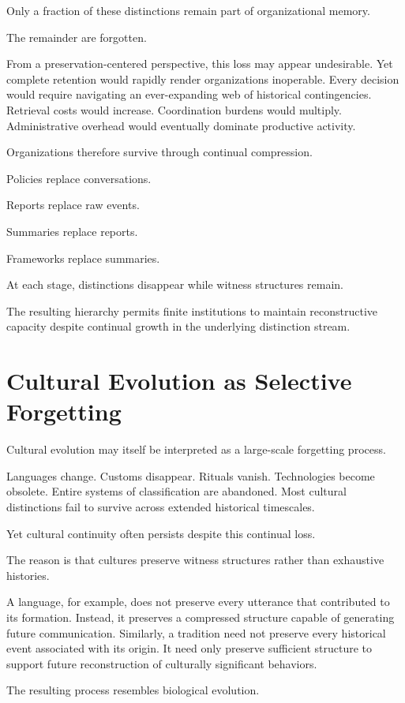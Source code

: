 \documentclass[12pt,oneside]{book}
\theoremstyle{plain} \newtheorem{theorem}{Theorem}[chapter] \newtheorem{lemma}[theorem]{Lemma} \newtheorem{proposition}[theorem]{Proposition} \newtheorem{corollary}[theorem]{Corollary}
\theoremstyle{definition} \newtheorem{definition}[theorem]{Definition} \newtheorem{axiom}[theorem]{Axiom} \newtheorem{construction}[theorem]{Construction}
\theoremstyle{remark} \newtheorem{remark}[theorem]{Remark} \newtheorem{example}[theorem]{Example}
\begin{document}
Only a fraction of these distinctions remain part of organizational memory.

The remainder are forgotten.

From a preservation-centered perspective, this loss may appear undesirable. Yet complete retention would rapidly render organizations inoperable. Every decision would require navigating an ever-expanding web of historical contingencies. Retrieval costs would increase. Coordination burdens would multiply. Administrative overhead would eventually dominate productive activity.

Organizations therefore survive through continual compression.

Policies replace conversations.

Reports replace raw events.

Summaries replace reports.

Frameworks replace summaries.

At each stage, distinctions disappear while witness structures remain.

The resulting hierarchy permits finite institutions to maintain reconstructive capacity despite continual growth in the underlying distinction stream.

\section{Cultural Evolution as Selective Forgetting}

Cultural evolution may itself be interpreted as a large-scale forgetting process.

Languages change. Customs disappear. Rituals vanish. Technologies become obsolete. Entire systems of classification are abandoned. Most cultural distinctions fail to survive across extended historical timescales.

Yet cultural continuity often persists despite this continual loss.

The reason is that cultures preserve witness structures rather than exhaustive histories.

A language, for example, does not preserve every utterance that contributed to its formation. Instead, it preserves a compressed structure capable of generating future communication. Similarly, a tradition need not preserve every historical event associated with its origin. It need only preserve sufficient structure to support future reconstruction of culturally significant behaviors.

The resulting process resembles biological evolution.
\end{document}
